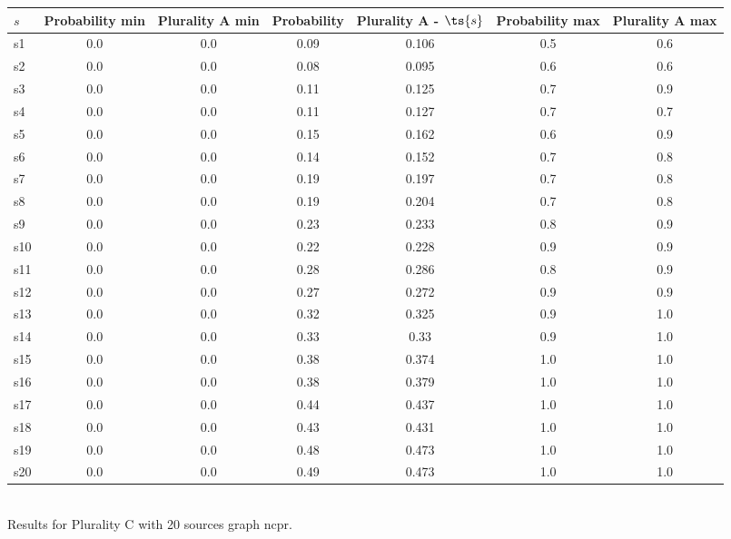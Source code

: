 \documentclass{article}
\begin{document}
\noindent\begin{tabular}{|l|c|c|c|c|c|c|}
\hline
$s$& Probability min & Plurality A min & Probability & Plurality A - $\ts{s}$ & Probability max & Plurality A max\\
\hline
s1 &0.0 & 0.0 & 0.09 & 0.106 & 0.5 & 0.6\\
\hline
s2 &0.0 & 0.0 & 0.08 & 0.095 & 0.6 & 0.6\\
\hline
s3 &0.0 & 0.0 & 0.11 & 0.125 & 0.7 & 0.9\\
\hline
s4 &0.0 & 0.0 & 0.11 & 0.127 & 0.7 & 0.7\\
\hline
s5 &0.0 & 0.0 & 0.15 & 0.162 & 0.6 & 0.9\\
\hline
s6 &0.0 & 0.0 & 0.14 & 0.152 & 0.7 & 0.8\\
\hline
s7 &0.0 & 0.0 & 0.19 & 0.197 & 0.7 & 0.8\\
\hline
s8 &0.0 & 0.0 & 0.19 & 0.204 & 0.7 & 0.8\\
\hline
s9 &0.0 & 0.0 & 0.23 & 0.233 & 0.8 & 0.9\\
\hline
s10 &0.0 & 0.0 & 0.22 & 0.228 & 0.9 & 0.9\\
\hline
s11 &0.0 & 0.0 & 0.28 & 0.286 & 0.8 & 0.9\\
\hline
s12 &0.0 & 0.0 & 0.27 & 0.272 & 0.9 & 0.9\\
\hline
s13 &0.0 & 0.0 & 0.32 & 0.325 & 0.9 & 1.0\\
\hline
s14 &0.0 & 0.0 & 0.33 & 0.33 & 0.9 & 1.0\\
\hline
s15 &0.0 & 0.0 & 0.38 & 0.374 & 1.0 & 1.0\\
\hline
s16 &0.0 & 0.0 & 0.38 & 0.379 & 1.0 & 1.0\\
\hline
s17 &0.0 & 0.0 & 0.44 & 0.437 & 1.0 & 1.0\\
\hline
s18 &0.0 & 0.0 & 0.43 & 0.431 & 1.0 & 1.0\\
\hline
s19 &0.0 & 0.0 & 0.48 & 0.473 & 1.0 & 1.0\\
\hline
s20 &0.0 & 0.0 & 0.49 & 0.473 & 1.0 & 1.0\\
\hline
\end{tabular}\\

\noindent Results for Plurality C with 20 sources graph ncpr.
\end{document}
